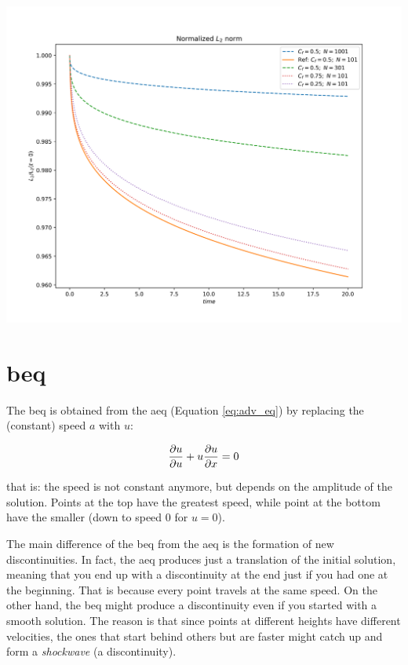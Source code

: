 \documentclass[11pt, a4paper]{article}
\begin{document}
\begin{center}
    \centering
    \includegraphics[width=0.9\linewidth]{images/L2_STEP_LAX-W.png}
    \label{fig:step_laxw_l2_tot}
\end{center}

\section{\acrfull{beq}}

The \acrlong{beq} is obtained from the \acrlong{aeq} (Equation \ref{eq:adv_eq})
by replacing the (constant) speed \(a\) with \(u\):

\begin{equation} \label{eq:burg_eq_nc}
    \pdv{u}{u} + u \pdv{u}{x} = 0
\end{equation}

\noindent
that is: the speed is not constant anymore, but depends on the amplitude of the
solution. Points at the top have the greatest speed, while point at the bottom
have the smaller (down to speed \(0\) for \(u = 0\)).

The main difference of the \acrshort{beq} from the \acrshort{aeq} is the
formation of new discontinuities. In fact, the \acrshort{aeq} produces just a
translation of the initial solution, meaning that you end up with a discontinuity
at the end just if you had one at the beginning. That is because every point
travels at the same speed. On the other hand, the \acrshort{beq} might produce
a discontinuity even if you started with a smooth solution. The reason is that
since points at different heights have different velocities, the ones that start
behind others but are faster might catch up and form a \textit{shockwave}
(a discontinuity).
\end{document}
